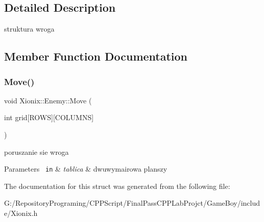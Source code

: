 \subsection{Detailed Description}
struktura wroga 

\subsection{Member Function Documentation}
\mbox{\label{struct_xionix_1_1_enemy_aa37b00bb10fedf6d3f678216ed496415}} 
\subsubsection{\texorpdfstring{Move()}{Move()}}
{\footnotesize\ttfamily void Xionix\+::\+Enemy\+::\+Move (\begin{DoxyParamCaption}\item[{int}]{grid\mbox{[}\+R\+O\+W\+S\mbox{]}\mbox{[}\+C\+O\+L\+U\+M\+N\+S\mbox{]} }\end{DoxyParamCaption})\hspace{0.3cm}{\ttfamily [inline]}}



poruszanie sie wroga 


\begin{DoxyParams}[1]{Parameters}
\mbox{\texttt{ in}}  & {\em tablica} & dwuwymairowa planszy \\
\hline
\end{DoxyParams}


The documentation for this struct was generated from the following file\+:\begin{DoxyCompactItemize}
\item 
G\+:/\+Repository\+Programing/\+C\+P\+P\+Script/\+Final\+Pass\+C\+P\+P\+Lab\+Projct/\+Game\+Boy/include/Xionix.\+h\end{DoxyCompactItemize}
